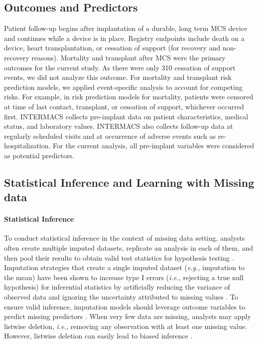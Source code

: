 \documentclass{article}
\begin{document}
\hypertarget{outcomes-and-predictors}{%
\subsection{Outcomes and Predictors}\label{outcomes-and-predictors}}

Patient follow-up begins after implantation of a durable, long term MCS
device and continues while a device is in place. Registry endpoints
include death on a device, heart transplantation, or cessation of
support (for recovery and non-recovery reasons). Mortality and
transplant after MCS were the primary outcomes for the current study. As
there were only 310 cessation of support events, we did not analyze this
outcome. For mortality and transplant risk prediction models, we applied
event-specific analysis to account for competing risks. For example, in
risk prediction models for mortality, patients were censored at time of
last contact, transplant, or cessation of support, whichever occurred
first. INTERMACS collects pre-implant data on patient characteristics,
medical status, and laboratory values. INTERMACS also collects follow-up
data at regularly scheduled visits and at occurrence of adverse events
such as re-hospitalization. For the current analysis, all pre-implant
variables were considered as potential predictors.

\hypertarget{statistical-inference-and-learning-with-missing-data}{%
\subsection{Statistical Inference and Learning with Missing
data}\label{statistical-inference-and-learning-with-missing-data}}

\label{subsec:inference_and_learning}

\paragraph{Statistical Inference}

To conduct statistical inference in the context of missing data setting,
analysts often create multiple imputed datasets, replicate an analysis
in each of them, and then pool their results to obtain valid test
statistics for hypothesis testing \cite{rubin2004multiple}. Imputation
strategies that create a single imputed dataset
(\textit{e.g., } imputation to the mean) have been shown to increase
type I errors (\textit{i.e., } rejecting a true null hypothesis) for
inferential statistics by artificially reducing the variance of observed
data and ignoring the uncertainty attributed to missing values
\cite{van2018flexible}. To ensure valid inference, imputation models
should leverage outcome variables to predict missing predictors
\cite{sterne2009multiple}. When very few data are missing, analysts may
apply listwise deletion, \textit{i.e., } removing any observation with
at least one missing value. However, listwise deletion can easily lead
to biased inference \cite{van2020rebutting}.
\end{document}
